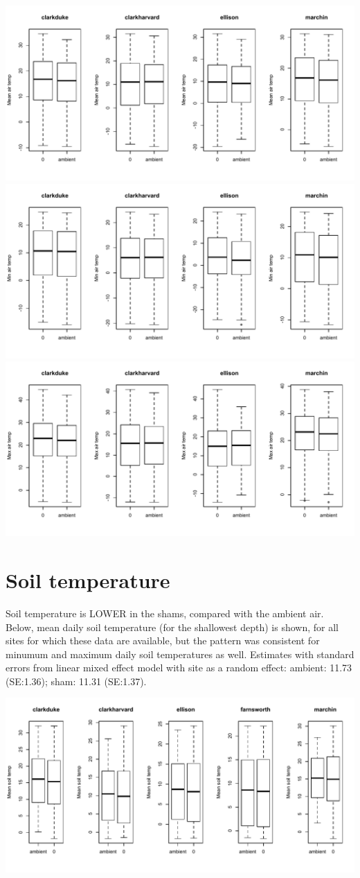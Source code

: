 \documentclass{article}
\begin{document}
\includegraphics{Analyses/output/shamvambient_airtemp.pdf}
\includegraphics{Analyses/output/shamvambient_airtempmin.pdf}
\includegraphics{Analyses/output/shamvambient_airtempmax.pdf}

\section {Soil temperature}
Soil temperature is LOWER in the shams, compared with the ambient air. Below, mean daily soil temperature (for the shallowest depth) is shown, for all sites for which these data are available, but the pattern was consistent for minumum and maximum daily soil temperatures as well. Estimates with standard errors from linear mixed effect model with site as a random effect: ambient: 11.73 (SE:1.36); sham: 11.31 (SE:1.37).

\includegraphics{Analyses/output/shamvambient_soiltemp.pdf}
\end{document}
